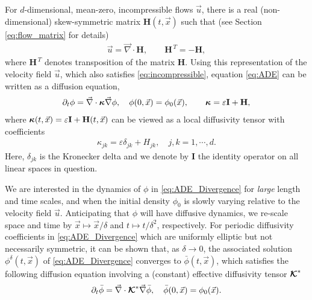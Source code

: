 \documentclass[11pt]{amsart}
\newcommand{\Hb}{\mathbf{H}}
\newcommand{\Ib}{\mathbf{I}}
\newcommand\Kbc{\mbox{\boldmath${\mathcal{K}}$}}
\newcommand\bkappa{\mbox{\boldmath${\kappa}$}}
\begin{document}
For $d$-dimensional, mean-zero, incompressible flows $\vec{u}$, there
is a real (non-dimensional) skew-symmetric 
matrix $\Hb(t,\vec{x})$ such that (see Section \ref{eq:flow_matrix}
for details) 
\begin{align}\label{eq:u_DH}
 \vec{u}=\vec{\nabla}\cdot\Hb, \qquad  \Hb^{\,T}=-\Hb,
\end{align}
where $\Hb^{\,T}$ denotes transposition of the matrix $\Hb$.
Using this representation of the velocity field $\vec{u}$, which also
satisfies \eqref{eq:incompressible}, equation \eqref{eq:ADE} can be
written as a diffusion equation,  
%
\begin{align}\label{eq:ADE_Divergence}
  \partial_t\phi%
    =\vec{\nabla}\cdot\bkappa\vec{\nabla}\phi, \quad
    \phi(0,\vec{x})=\phi_0(\vec{x}),
    \qquad
    \bkappa=\varepsilon\Ib+\Hb,
\end{align}
%
where $\bkappa(t,\vec{x})=\varepsilon\Ib+\Hb(t,\vec{x})$ can be viewed as a local
diffusivity tensor with coefficients
%
\begin{align}\label{eq:kappa_coeff}
  \kappa_{jk}=\varepsilon\delta_{jk}+H_{jk},\quad j,k=1,\cdots,d.
\end{align}
%
Here, $\delta_{jk}$ is the Kronecker delta and we denote by $\Ib$ the
identity operator on all linear spaces in question.    






We are interested in the dynamics of $\phi$ in \eqref{eq:ADE_Divergence}
for \emph{large} length and time scales, and when the initial density
$\phi_0$ is slowly varying relative to the velocity field
$\vec{u}$. Anticipating that $\phi$ will have diffusive dynamics, we
re-scale space and time by $\vec{x}\mapsto\vec{x}/\delta$ and $t\mapsto t/\delta^2$,
respectively.  For periodic diffusivity coefficients in
\eqref{eq:ADE_Divergence} which are uniformly elliptic but not
necessarily symmetric, it can be shown \cite{Fannjiang:SIAM_JAM:333}
that, as $\delta\to0$, the associated solution $\phi^\delta(t,\vec{x})$ of
\eqref{eq:ADE_Divergence} converges to $\bar{\phi}(t,\vec{x})$,
which satisfies the following diffusion equation involving a (constant)
effective diffusivity tensor $\Kbc^*$    
%
\begin{align}\label{eq:phi_bar}
  \partial_t\bar{\phi}=\vec{\nabla}\cdot\Kbc^*\vec{\nabla}\bar{\phi}, \quad
  \bar{\phi}(0,\vec{x})=\phi_0(\vec{x}).
\end{align}
%
\end{document}
